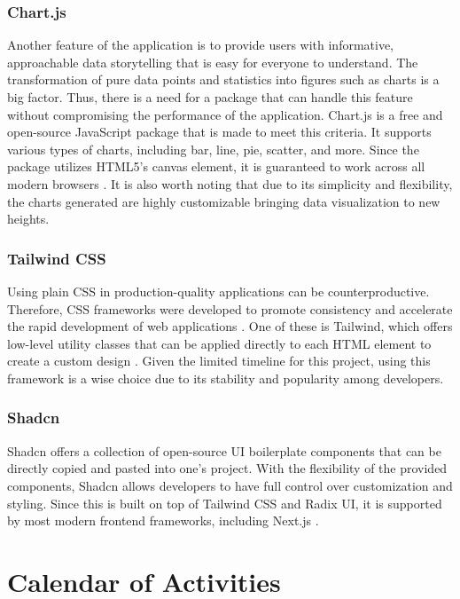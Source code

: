 \subsubsection{Chart.js}
Another feature of the application is to provide users with informative, approachable data storytelling that is easy for everyone to understand. The transformation of pure data points and statistics into figures such as charts is a big factor. Thus, there is a need for a package that can handle this feature without compromising the performance of the application. Chart.js is a free and open-source JavaScript package that is made to meet this criteria. It supports various types of charts, including bar, line, pie, scatter, and more. Since the package utilizes HTML5's canvas element, it is guaranteed to work across all modern browsers \cite{chartjs-no-date}. It is also worth noting that due to its simplicity and flexibility, the charts generated are highly customizable bringing data visualization to new heights. 

\subsubsection{Tailwind CSS}
Using plain CSS in production-quality applications can be counterproductive. Therefore, CSS frameworks were developed to promote consistency and accelerate the rapid development of web applications \cite{joel-2021}. One of these is Tailwind, which offers low-level utility classes that can be applied directly to each HTML element to create a custom design \cite{tailwind-no-date}. Given the limited timeline for this project, using this framework is a wise choice due to its stability and popularity among developers.

\subsubsection{Shadcn}
Shadcn offers a collection of open-source UI boilerplate components that can be directly copied and pasted into one's project. With the flexibility of the provided components, Shadcn allows developers to have full control over customization and styling. Since this is built on top of Tailwind CSS and Radix UI, it is supported by most modern frontend frameworks, including Next.js \cite{shadcn-no-date}.

\section{Calendar of Activities}

